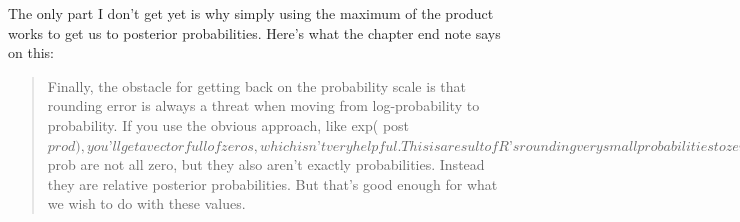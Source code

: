 \documentclass[
]{book}
\newenvironment{Shaded}{\begin{snugshade}}{\end{snugshade}}
\newcommand{\AttributeTok}[1]{\textcolor[rgb]{0.77,0.63,0.00}{#1}}
\newcommand{\CommentTok}[1]{\textcolor[rgb]{0.56,0.35,0.01}{\textit{#1}}}
\newcommand{\ConstantTok}[1]{\textcolor[rgb]{0.00,0.00,0.00}{#1}}
\newcommand{\DecValTok}[1]{\textcolor[rgb]{0.00,0.00,0.81}{#1}}
\newcommand{\FunctionTok}[1]{\textcolor[rgb]{0.00,0.00,0.00}{#1}}
\newcommand{\NormalTok}[1]{#1}
\newcommand{\OtherTok}[1]{\textcolor[rgb]{0.56,0.35,0.01}{#1}}
\newcommand{\SpecialCharTok}[1]{\textcolor[rgb]{0.00,0.00,0.00}{#1}}
\begin{document}
\begin{Shaded}
\end{Shaded}

The only part I don't get yet is why simply using the maximum of the product works to get us to posterior probabilities. Here's what the chapter end note says on this:

\begin{quote}
Finally, the obstacle for getting back on the probability scale is that rounding error is always a threat when moving from log-probability to probability. If you use the obvious approach, like exp( post\(prod ), you’ll get a vector full of zeros, which isn’t very helpful. This is a result of R’s rounding very small probabilities to zero. Remember, in large samples, all unique samples are unlikely. This is why you have to work with log-probability. The code in the box dodges this problem by scaling all of the log-products by the maximum log-product. As a result, the values in post\)prob are not all zero, but they also aren't exactly probabilities. Instead they are relative posterior probabilities. But that's good enough for what we wish to do with these values.
\end{quote}
\end{document}
